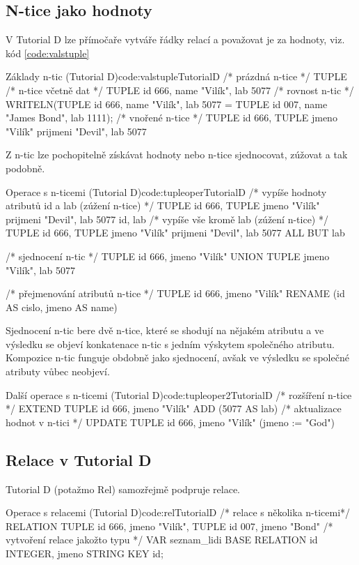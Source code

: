 \subsection{N-tice jako hodnoty}
V Tutorial D lze přímočaře vytváře řádky relací a považovat je za hodnoty, viz. kód \ref{code:valstuple}
\begin{upcode}{Základy n-tic (Tutorial D)}{code:valstuple}{TutorialD}
/* prázdná n-tice */
TUPLE {}
/* n-tice včetně dat */
TUPLE {id 666, name "Vilík", lab 5077}
/* rovnost n-tic */
WRITELN(TUPLE {id 666, name "Vilík", lab 5077} = TUPLE {id 007, name "James Bond", lab 1111});
/* vnořené n-tice */
TUPLE {id 666, TUPLE {jmeno "Vilík" prijmeni "Devil"}, lab 5077}
\end{upcode}
Z n-tic lze pochopitelně získávat hodnoty nebo n-tice sjednocovat, zúžovat a tak podobně.
\begin{upcode}{Operace s n-ticemi (Tutorial D)}{code:tupleoper}{TutorialD}
/* vypíše hodnoty atributů id a lab (zúžení n-tice) */
TUPLE {id 666, TUPLE {jmeno "Vilík" prijmeni "Devil"}, lab 5077} {id, lab}
/* vypíše vše kromě lab (zúžení n-tice) */
TUPLE {id 666, TUPLE {jmeno "Vilík" prijmeni "Devil"}, lab 5077} {ALL BUT lab}

/* sjednocení n-tic */
TUPLE {id 666, jmeno "Vilík"} UNION TUPLE {jmeno "Vilík", lab 5077}

/* přejmenování atributů n-tice */
TUPLE {id 666, jmeno "Vilík"} RENAME (id AS cislo, jmeno AS name)
\end{upcode}
Sjednocení n-tic bere dvě n-tice, které se shodují na nějakém atributu a ve výsledku se objeví konkatenace n-tic s jedním výskytem společného atributu. Kompozice n-tic funguje obdobně jako sjednocení, avšak ve výsledku se společné atributy vůbec neobjeví.
\begin{upcode}{Další operace s n-ticemi (Tutorial D)}{code:tupleoper2}{TutorialD}
/* rozšíření n-tice */
EXTEND TUPLE {id 666, jmeno "Vilík"} ADD (5077 AS lab)
/* aktualizace hodnot v n-tici */
UPDATE TUPLE {id 666, jmeno "Vilík"} (jmeno := "God")
\end{upcode}

\subsection{Relace v Tutorial D}
Tutorial D (potažmo Rel) samozřejmě podpruje relace.
\begin{upcode}{Operace s relacemi (Tutorial D)}{code:rel}{TutorialD}
/* relace s několika n-ticemi*/
RELATION {
	TUPLE {id 666, jmeno "Vilík"},
	TUPLE {id 007, jmeno "Bond"}
}
/* vytvoření relace jakožto typu */
VAR seznam_lidi BASE RELATION {id INTEGER, jmeno STRING} KEY {id};
\end{upcode}

\section{}